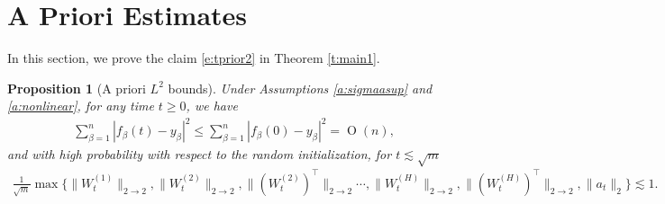 \documentclass{article}
\numberwithin{equation}{section}
\newcommand{\al}{\alpha}
\DeclareMathOperator{\OO}{O}
\renewcommand{\leq}{\leqslant}
\renewcommand{\geq}{\geqslant}
\newcommand{\cor}{\color{darkred}}
\newcommand{\cob}{\color{darkblue}}
\newcommand{\nc}{\normalcolor}
\newcommand{\1}{\mathds{1}}
\theoremstyle{plain} %
\newtheorem{proposition}[theorem]{Proposition}
\begin{document}


\section{A Priori Estimates}
\label{s:prior}


In this section, we prove the claim \eqref{e:tprior2} in Theorem \ref{t:main1}.

\begin{proposition}[A priori $L^2$ bounds] \label{p:L2bound}
Under Assumptions \ref{a:sigmaasup} and \ref{a:nonlinear}, for any time $t\geq 0$, we have
\begin{align}\label{e:fL2}
\sum_{\beta=1}^n|f_\beta(t)-y_\beta|^2\leq \sum_{\beta=1}^n|f_\beta(0)-y_\beta|^2=\OO(n),
\end{align}
and with high probability with respect to the random initialization,
for $t\lesssim \sqrt m$ 
\begin{align}\label{e:L2norm}
\frac{1}{\sqrt m}\max\{\|W_t^{(1)}\|_{2\rightarrow 2}, \|W_t^{(2)}\|_{2\rightarrow 2},\|(W_t^{(2)})^\top\|_{2\rightarrow 2}\cdots, \|W_t^{(H)}\|_{2\rightarrow 2}, \|(W_t^{(H)})^\top\|_{2\rightarrow 2},\|a_t\|_{2}\}\lesssim 1.
\end{align}
\end{proposition}
\end{document}
